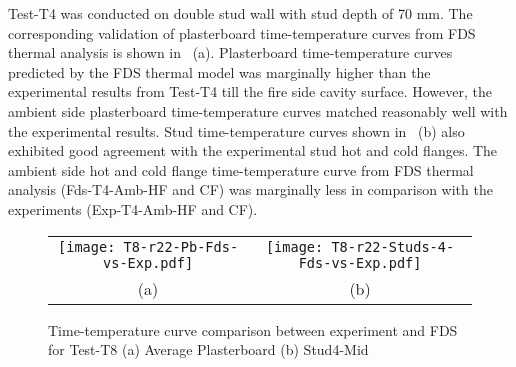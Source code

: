 Test-T4 was conducted on double stud wall with stud depth of 70 mm. The corresponding validation of plasterboard time-temperature curves from FDS thermal analysis is shown in ~(a). Plasterboard time-temperature curves predicted by the FDS thermal model was marginally higher than the experimental results from Test-T4 till the fire side cavity surface. However, the ambient side plasterboard time-temperature curves matched reasonably well with the experimental results. Stud time-temperature curves shown in ~(b) also exhibited good agreement with the experimental stud hot and cold flanges. The ambient side hot and cold flange time-temperature curve from FDS thermal analysis (Fds-T4-Amb-HF and CF) was marginally less in comparison with the experiments (Exp-T4-Amb-HF and CF).
\begin{figure}[!htbp]
	\centering
		\begin{tabular}{cc}
			\texttt{[image: T8-r22-Pb-Fds-vs-Exp.pdf]} & \texttt{[image: T8-r22-Studs-4-Fds-vs-Exp.pdf]} \\
			(a) & (b) \\
		\end{tabular} 
		\caption{Time-temperature curve comparison between experiment and FDS for Test-T8 (a) Average Plasterboard (b) Stud4-Mid}
		\label{fig:fds-output-pb-studs-t8}
\end{figure}

